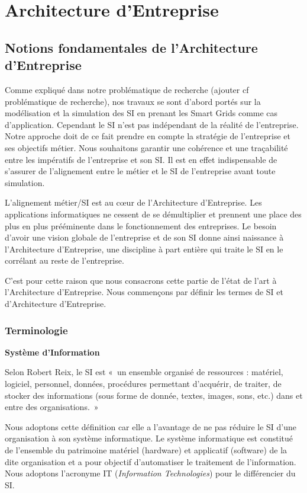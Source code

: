 \chapter{Architecture d'Entreprise}
\label{chap:EA}





\section{Notions fondamentales de l'Architecture d'Entreprise}

Comme expliqué dans notre problématique de recherche (ajouter cf problématique de recherche),   nos travaux se sont d'abord portés sur la modélisation et la simulation des SI en prenant les Smart Grids comme cas d'application. Cependant le SI n'est pas indépendant de la réalité de l'entreprise. Notre approche doit de ce fait prendre en compte la stratégie de l'entreprise et ses objectifs métier. Nous souhaitons garantir une cohérence et une traçabilité entre les impératifs de l'entreprise et son SI. Il est en effet indispensable de s'assurer de l'alignement entre le métier et le SI de l'entreprise avant toute simulation. 

L'alignement métier/SI est au cœur de l'Architecture d'Entreprise. Les applications informatiques ne cessent de se démultiplier et prennent une place des plus en plus prééminente dans le fonctionnement des entreprises. Le besoin d'avoir une vision globale de l'entreprise et de son SI donne ainsi naissance à l'Architecture d'Entreprise, une discipline à part entière qui traite le SI en le corrélant au reste de l'entreprise. 

C'est pour cette raison que nous consacrons cette partie de l'état de l'art à l'Architecture d'Entreprise. Nous commençons par définir les termes de SI et d'Architecture d'Entreprise. 
  
	\subsection{Terminologie}

\textbf{Système d'Information}

Selon Robert Reix, le SI est «~un ensemble organisé de ressources : matériel, 
logiciel, personnel, données, procédures permettant d'acquérir, de traiter, de 
stocker des informations (sous forme de donnée, textes, images, sons, etc.) dans 
et entre des organisations.~»

Nous adoptons cette définition car elle a l'avantage de ne pas réduire le SI 
d'une organisation à son système informatique. Le système informatique est constitué de 
l'ensemble du patrimoine matériel (hardware) et applicatif (software) de la dite 
organisation et a pour objectif d'automatiser le traitement de l'information. 
Nous adoptons l'acronyme IT (\textit{Information Technologies}) pour le 
différencier du SI.

